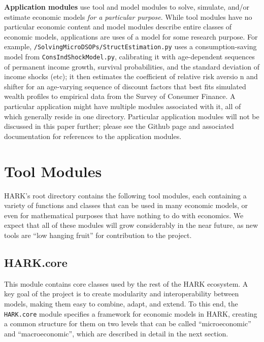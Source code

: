 \documentclass[10pt,twocolumn]{article}
\begin{document}
\textbf{Application modules} use tool and model modules to solve, simulate, and/or estimate economic models \emph{for a particular purpose}. While tool modules have no particular economic content and model modules describe entire classes of economic models, applications are uses of a model for some research purpose. For example, \texttt{/SolvingMicroDSOPs/StructEstimation.py} uses a consumption-saving model from \texttt{ConsIndShockModel.py}, calibrating it with age-dependent sequences of permanent income growth, survival probabilities, and the standard deviation of income shocks (etc); it then estimates the coefficient of relative risk aversio n and shifter for an age-varying sequence of discount factors that best fits simulated wealth profiles to empirical data from the Survey of Consumer Finance. A particular application might have multiple modules associated with it, all of which generally reside in one directory. Particular application modules will not be discussed in this paper further; please see the Github page and associated documentation for references to the application modules.

\section{\texorpdfstring{Tool Modules
\label{sec:tool-modules}}{Tool Modules }}\label{tool-modules}

HARK's root directory contains the following tool modules, each containing a variety of functions and classes that can be used in many economic models, or even for mathematical purposes that have nothing to do with economics. We expect that all of these modules will grow considerably in the near future, as new tools are ``low hanging fruit'' for contribution to the project.

\subsection{HARK.core}\label{harkcore}

This module contains core classes used by the rest of the HARK ecosystem. A key goal of the project is to create modularity and interoperability between models, making them easy to combine, adapt, and extend. To this end, the \texttt{HARK.core} module specifies a framework for economic models in HARK, creating a common structure for them on two levels that can be called ``microeconomic'' and ``macroeconomic'', which are described in detail in the next section.
\end{document}
